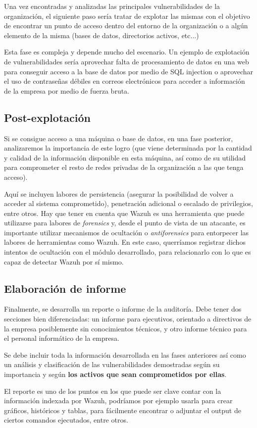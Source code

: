 Una vez encontradas y analizadas las principales vulnerabilidades de la organización, el siguiente paso sería tratar de explotar las mismas con el objetivo de encontrar un punto de acceso dentro del entorno de la organización o a algún elemento de la misma (bases de datos, directorios activos, etc...)

Esta fase es compleja y depende mucho del escenario. Un ejemplo de explotación de vulnerabilidades sería aprovechar falta de procesamiento de datos en una web para conseguir acceso a la base de datos por medio de SQL injection o aprovechar el uso de contraseñas débiles en correos electrónicos para acceder a información de la empresa por medio de fuerza bruta.

\subsection{Post-explotación}

Si se consigue acceso a una máquina o base de datos, en una fase posterior, analizaremos la importancia de este logro (que viene determinada por la cantidad y calidad de la información disponible en esta máquina, así como de su utilidad para comprometer el resto de redes privadas de la organización a las que tenga acceso). 

Aquí se incluyen labores de persistencia (asegurar la posibilidad de volver a acceder al sistema comprometido), penetración adicional o escalado de privilegios, entre otros. Hay que tener en cuenta que Wazuh es una herramienta que puede utilizarse para labores de {\it \gls{forensics}} y, desde el punto de vista de un atacante, es importante utilizar mecanismos de ocultación o {\it \gls{antiforensics}} para entorpecer las labores de herramientas como Wazuh. En este caso, querríamos registrar dichos intentos de ocultación con el módulo desarrollado, para relacionarlo con lo que es capaz de detectar Wazuh por sí mismo.

\subsection{Elaboración de informe}

Finalmente, se desarrolla un reporte o informe de la auditoría. Debe tener dos secciones bien diferenciadas: un informe para ejecutivos, orientado a directivos de la empresa posiblemente sin conocimientos técnicos, y otro informe técnico para el personal informático de la empresa.

Se debe incluir toda la información desarrollada en las fases anteriores así como un análisis y clasificación de las vulnerabilidades demostradas según su importancia y según \textbf{los activos que sean comprometidos por ellas}.

El reporte es uno de los puntos en los que puede ser clave contar con la información indexada por Wazuh, podríamos por ejemplo usarla para crear gráficos, históricos y tablas, para fácilmente encontrar o adjuntar el output de ciertos comandos ejecutados, entre otros.

